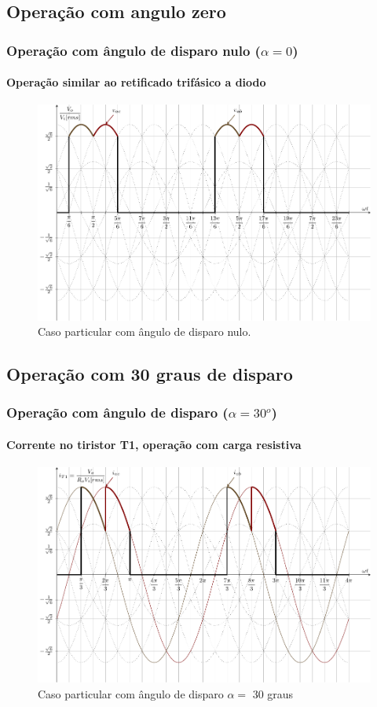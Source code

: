 \documentclass[aspectratio=43]{beamer}
\begin{document}
\subsection{Operação com angulo zero}
\begin{frame}
	\frametitle{Operação com ângulo de disparo nulo ($\alpha=0$)}
	\framesubtitle{Operação similar ao retificado trifásico a diodo}
	
\begin{figure}
	\centering
	\includegraphics[width=0.7\linewidth]{figuras/SenosDrawSEQnT1alpha0}
	\caption{Caso particular com ângulo de disparo nulo.}
	\label{fig:SenosDrawSEQnT1alpha0}
\end{figure}

\end{frame}



\subsection{Operação com 30 graus de disparo}
\begin{frame}
	\frametitle{Operação com ângulo de disparo  ($\alpha=30^o$)}
	\framesubtitle{Corrente no tiristor T1, operação com carga resistiva}
	
	\begin{figure}
\centering
\includegraphics[width=0.7\linewidth]{figuras/SenosDrawSEQnT1alpha30}
\caption{Caso particular com ângulo de disparo $\alpha =$ 30 graus}
\label{fig:SenosDrawSEQnT1alpha30}
\end{figure}


\end{frame}
\end{document}
